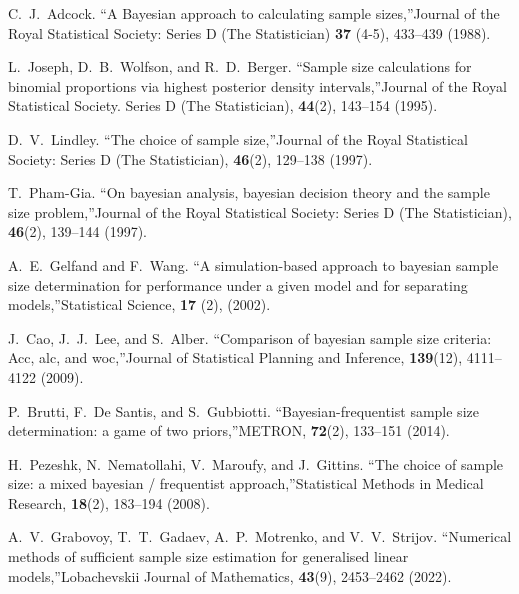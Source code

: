 \documentclass[
11pt,%
tightenlines,%
twoside,%
onecolumn,%
nofloats,%
nobibnotes,%
nofootinbib,%
superscriptaddress,%
noshowpacs,%
centertags]%
{revtex4-2}
\begin{document}
\begin{thebibliography}{99}

C.~J.~Adcock. \textquotedblleft A Bayesian approach to calculating sample sizes,\textquotedblright Journal of the Royal Statistical Society: Series D (The Statistician) \textbf{37} (4-5), 433--439 (1988).

L.~Joseph, D.~B.~Wolfson, and R.~D.~Berger. \textquotedblleft Sample size calculations for binomial proportions via highest posterior density intervals,\textquotedblright Journal of the Royal Statistical Society. Series D (The Statistician), \textbf{44}(2), 143--154 (1995).

D.~V.~Lindley. \textquotedblleft The choice of sample size,\textquotedblright Journal of the Royal Statistical Society: Series D (The Statistician), \textbf{46}(2), 129--138 (1997).

T.~Pham-Gia. \textquotedblleft On bayesian analysis, bayesian decision theory and the sample size problem,\textquotedblright Journal of the Royal Statistical Society: Series D (The Statistician), \textbf{46}(2), 139--144 (1997).

A.~E.~Gelfand and F.~Wang. \textquotedblleft A simulation-based approach to bayesian sample size determination for performance under a given model and for separating models,\textquotedblright Statistical Science, \textbf{17} (2), (2002).

J.~Cao, J.~J.~Lee, and S.~Alber. \textquotedblleft Comparison of bayesian sample size criteria: Acc, alc, and woc,\textquotedblright Journal of Statistical Planning and Inference, \textbf{139}(12), 4111--4122 (2009).

P.~Brutti, F.~De Santis, and S.~Gubbiotti. \textquotedblleft Bayesian-frequentist sample size determination: a game of two priors,\textquotedblright METRON, \textbf{72}(2), 133--151 (2014).

H.~Pezeshk, N.~Nematollahi, V.~Maroufy, and J.~Gittins. \textquotedblleft The choice of sample size: a mixed bayesian / frequentist approach,\textquotedblright Statistical Methods in Medical Research, \textbf{18}(2), 183--194 (2008).

A.~V.~Grabovoy, T.~T.~Gadaev, A.~P.~Motrenko, and V.~V.~Strijov. \textquotedblleft Numerical methods of sufficient sample size estimation for generalised linear models,\textquotedblright Lobachevskii Journal of Mathematics, \textbf{43}(9), 2453--2462 (2022).


\end{thebibliography}
\end{document}

